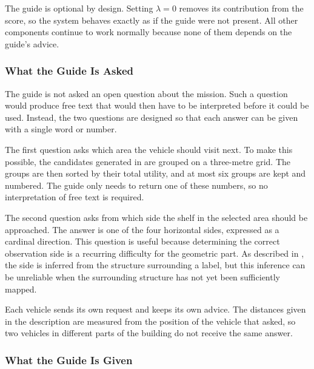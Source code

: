 The guide is optional by design. Setting $\lambda = 0$ removes its contribution
from the score, so the system behaves exactly as if the guide were not present.
All other components continue to work normally because none of them depends on
the guide's advice.


\subsubsection*{What the Guide Is Asked}

The guide is not asked an open question about the mission. Such a question would
produce free text that would then have to be interpreted before it could be used.
Instead, the two questions are designed so that each answer can be given with a
single word or number.

The first question asks which area the vehicle should visit next. To make this
possible, the candidates generated in  are grouped on a
three-metre grid. The groups are then sorted by their total utility, and at most
six groups are kept and numbered. The guide only needs to return one of these
numbers, so no interpretation of free text is required.

The second question asks from which side the shelf in the selected area should be
approached. The answer is one of the four horizontal sides, expressed as a
cardinal direction. This question is useful because determining the correct
observation side is a recurring difficulty for the geometric part. As described
in , the side is inferred from the structure surrounding
a label, but this inference can be unreliable when the surrounding structure has
not yet been sufficiently mapped.

Each vehicle sends its own request and keeps its own advice. The distances given
in the description are measured from the position of the vehicle that asked, so
two vehicles in different parts of the building do not receive the same answer.

\subsubsection*{What the Guide Is Given}

